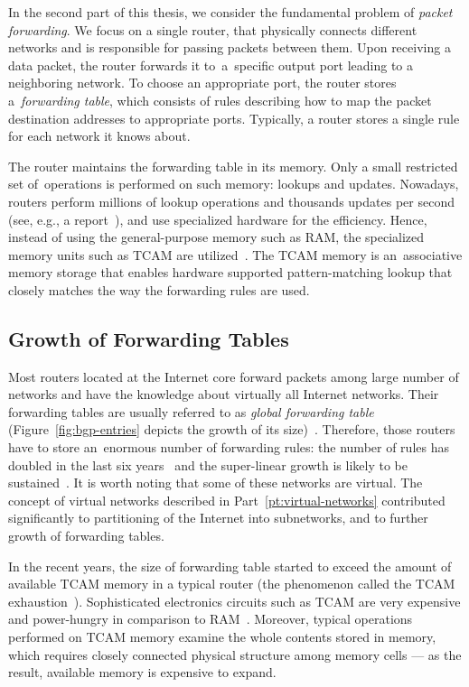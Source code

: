 In the second part of this thesis, we consider the fundamental problem of \emph{packet forwarding}.
We focus on a single router, that physically connects different networks and is responsible for passing packets between them.
Upon receiving a data packet, the router forwards it to~a~specific output port leading to a neighboring network.
To choose an appropriate port, the router stores a~\emph{forwarding table}, which consists of rules describing how to map the packet destination addresses to appropriate ports.
Typically, a router stores a single rule for each network it knows about.

The router maintains the forwarding table in its memory.
Only a small restricted set of~operations is performed on such memory: lookups and updates.
Nowadays, routers perform millions of lookup operations and thousands updates per second (see, e.g., a report~\cite{bgp-updates}), and use specialized hardware for the efficiency.
Hence, instead of using the general-purpose memory such as RAM, the specialized memory units such as TCAM are utilized~\cite{tcam-memory}.
The TCAM memory is an~associative memory storage that enables hardware supported pattern-matching lookup that closely matches the way the forwarding rules are used.

\subsection{Growth of Forwarding Tables}

Most routers located at the Internet core forward packets among large number of networks and have the knowledge about virtually all Internet networks.
Their forwarding tables are usually referred to as \emph{global forwarding table} (Figure~\ref{fig:bgp-entries} depicts the growth of its size)~\cite{url-bgp-entries}.
Therefore, those routers have to store an~enormous number of forwarding rules: the
number of rules has doubled in the last six years~\cite{bgp-routeviews} and
the super-linear growth is likely to be sustained~\cite{steve-myth}.
It is worth noting that some of these networks are virtual.
The concept of virtual networks described in Part~\ref{pt:virtual-networks} contributed significantly to partitioning of the Internet into subnetworks, and to further growth of forwarding tables.

In the recent years, the size of forwarding table started to exceed the amount of available TCAM memory in a typical router (the phenomenon called the TCAM exhaustion~\cite{tcam-exhaust}).
Sophisticated electronics circuits such as TCAM are very expensive and power-hungry in comparison to RAM~\cite{tcam-expensive}.
Moreover, typical operations performed on TCAM memory examine the whole contents stored in memory, which requires closely connected physical structure among memory cells --- as the result, available memory is expensive to expand.

